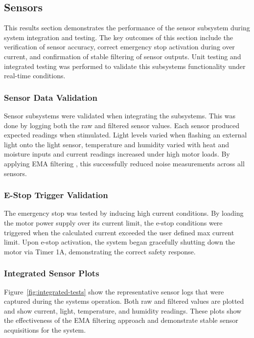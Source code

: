 \documentclass[a4paper, 11pt, titlepage]{article}
\begin{document}
\subsection{Sensors}
This results section demonstrates the  performance of the sensor subsystem during system integration and testing. The key outcomes of this section include the verification of sensor accuracy, correct emergency stop activation during over current, and confirmation of stable filtering of sensor outputs. Unit testing and integrated testing was performed to validate this subsystems functionality under real-time conditions. \\

\subsubsection{Sensor Data Validation}
Sensor subsystems were validated when integrating the subsystems. This was done by logging both the raw and filtered sensor values. Each sensor produced expected readings when stimulated. Light levels varied when flashing an external light onto the light sensor, temperature and humidity varied with heat and moisture inputs and current readings increased under high motor loads. By applying EMA filtering \parencite{hunter}, this successfully reduced noise measurements across all sensors.\\

\subsubsection{E-Stop Trigger Validation}
The emergency stop was tested by inducing high current conditions. By loading the motor power supply over its current limit, the e-stop conditions were triggered when the calculated current exceeded the user defined max current limit. Upon e-stop activation, the system began gracefully shutting down the motor via Timer 1A, demonstrating the correct safety response.\\

\subsubsection{Integrated Sensor Plots}

Figure~\ref{fig:integrated-tests} show the representative sensor logs that were captured during the systems operation. Both raw and filtered values are plotted and show current, light, temperature, and humidity readings. These plots show the effectiveness of the EMA filtering approach and demonstrate stable sensor acquisitions for the system.
\end{document}
